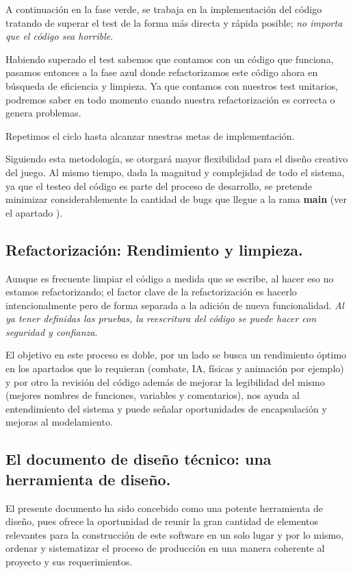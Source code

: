 A continuación en la fase verde, se trabaja en la implementación del código tratando de superar el test de la forma más directa y rápida posible; \textit{no importa que el código sea horrible}.

Habiendo superado el test sabemos que contamos con un código que funciona, pasamos entonces a la fase azul donde refactorizamos este código ahora en búsqueda de eficiencia y limpieza. Ya que contamos con nuestros test unitarios, podremos saber en todo momento cuando nuestra refactorización es correcta o genera problemas.

Repetimos el ciclo hasta alcanzar nuestras metas de implementación.

Siguiendo esta metodología, se otorgará mayor flexibilidad para el diseño creativo del juego. Al mismo tiempo, dada la magnitud y complejidad de todo el sistema, ya que el testeo del código es parte del proceso de desarrollo, se pretende minimizar considerablemente la cantidad de bugs que llegue a la rama \textbf{main} (ver el apartado ).

\subsection{Refactorización: Rendimiento y limpieza.}\label{principios:refactorizacion-rendimiento-limpieza}
Aunque es frecuente limpiar el código a medida que se escribe, al hacer eso no estamos refactorizando; el factor clave de la refactorización es hacerlo intencionalmente pero de forma separada a la adición de nueva funcionalidad. \emph{Al ya tener definidas las pruebas, la reescritura del código se puede hacer con seguridad y confianza}.

El objetivo en este proceso es doble, por un lado se busca un rendimiento óptimo en los apartados que lo requieran (combate, IA, físicas y animación por ejemplo) y por otro la revisión del código además de mejorar la legibilidad del mismo (mejores nombres de funciones, variables y comentarios), nos ayuda al entendimiento del sistema y puede señalar oportunidades de encapsulación y mejoras al modelamiento.

\subsection{El documento de diseño técnico: una herramienta de diseño.}\label{principios:documento-tecnico-como-herramienta}
El presente documento ha sido concebido como una potente herramienta de diseño, pues ofrece la oportunidad de reunir la gran cantidad de elementos relevantes para la construcción de este software en un solo lugar y por lo mismo, ordenar y sistematizar el proceso de producción en una manera coherente al proyecto y sus requerimientos.

